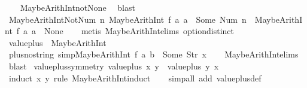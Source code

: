 \begin{isabellebody}
%
\isadelimproof
\ \ %
\endisadelimproof
%
\isatagproof
{}\isamarkupfalse%
\ MaybeArithInt{\isacharunderscore}not{\isacharunderscore}None\ \isamarkupfalse%
\ blast%
\endisatagproof
{\isafoldproof}%
%
\isadelimproof
\isanewline
%
\endisadelimproof
\isanewline
{}\isamarkupfalse%
\ MaybeArithInt{\isacharunderscore}Not{\isacharunderscore}Num{\isacharcolon}\ {\isachardoublequoteopen}{\isacharparenleft}{\isasymforall}n{\isachardot}\ MaybeArithInt\ f\ a{}\ a{}\ {\isasymnoteq}\ Some\ {\isacharparenleft}Num\ n{\isacharparenright}{\isacharparenright}\ {\isacharequal}\ {\isacharparenleft}MaybeArithInt\ f\ a{}\ a{}\ {\isacharequal}\ None{\isacharparenright}{\isachardoublequoteclose}\isanewline
%
\isadelimproof
\ \ %
\endisadelimproof
%
\isatagproof
{}\isamarkupfalse%
\ {\isacharparenleft}metis\ MaybeArithInt{\isachardot}elims\ option{\isachardot}distinct{\isacharparenleft}{}{\isacharparenright}{\isacharparenright}%
\endisatagproof
{\isafoldproof}%
%
\isadelimproof
\isanewline
%
\endisadelimproof
\isanewline
{}\isamarkupfalse%
\ {\isachardoublequoteopen}value{\isacharunderscore}plus\ {\isacharequal}\ MaybeArithInt\ {\isacharparenleft}{\isacharplus}{\isacharparenright}{\isachardoublequoteclose}\isanewline
\isanewline
{}\isamarkupfalse%
\ plus{\isacharunderscore}no{\isacharunderscore}string\ {\isacharbrackleft}simp{\isacharbrackright}{\isacharcolon}{\isachardoublequoteopen}MaybeArithInt\ f\ a\ b\ {\isasymnoteq}\ Some\ {\isacharparenleft}Str\ x{\isacharparenright}{\isachardoublequoteclose}\isanewline
%
\isadelimproof
\ \ %
\endisadelimproof
%
\isatagproof
{}\isamarkupfalse%
\ MaybeArithInt{\isachardot}elims\ \isamarkupfalse%
\ blast%
\endisatagproof
{\isafoldproof}%
%
\isadelimproof
\isanewline
%
\endisadelimproof
\isanewline
{}\isamarkupfalse%
\ value{\isacharunderscore}plus{\isacharunderscore}symmetry{\isacharcolon}\ {\isachardoublequoteopen}value{\isacharunderscore}plus\ x\ y\ {\isacharequal}\ value{\isacharunderscore}plus\ y\ x{\isachardoublequoteclose}\isanewline
%
\isadelimproof
\ \ %
\endisadelimproof
%
\isatagproof
{}\isamarkupfalse%
\ {\isacharparenleft}induct\ x\ y\ rule{\isacharcolon}\ MaybeArithInt{\isachardot}induct{\isacharparenright}\isanewline
\ \ \isamarkupfalse%
\ {\isacharparenleft}simp{\isacharunderscore}all\ add{\isacharcolon}\ value{\isacharunderscore}plus{\isacharunderscore}def{\isacharparenright}%
\endisatagproof
{\isafoldproof}%

\end{isabellebody}
